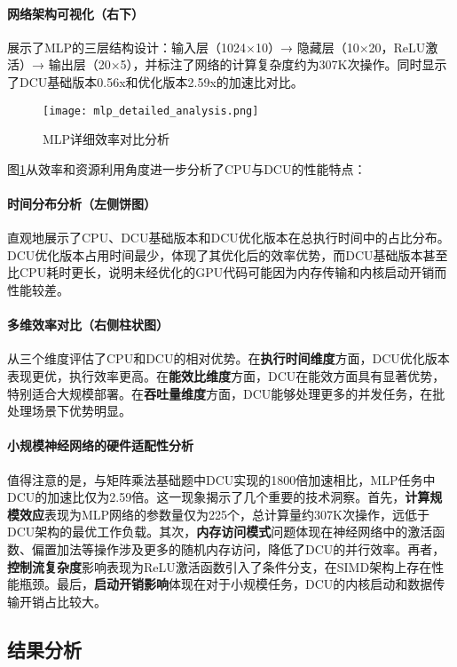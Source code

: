 \documentclass[a4paper]{article}
\begin{document}
\paragraph{网络架构可视化（右下）}展示了MLP的三层结构设计：输入层（1024×10）→ 隐藏层（10×20，ReLU激活）→ 输出层（20×5），并标注了网络的计算复杂度约为307K次操作。同时显示了DCU基础版本0.56x和优化版本2.59x的加速比对比。

\begin{figure}[H]
\centering
\texttt{[image: mlp\_detailed\_analysis.png]}
\caption{MLP详细效率对比分析}
\label{fig:mlp_detailed}
\end{figure}

图\ref{fig:mlp_detailed}从效率和资源利用角度进一步分析了CPU与DCU的性能特点：

\paragraph{时间分布分析（左侧饼图）}直观地展示了CPU、DCU基础版本和DCU优化版本在总执行时间中的占比分布。DCU优化版本占用时间最少，体现了其优化后的效率优势，而DCU基础版本甚至比CPU耗时更长，说明未经优化的GPU代码可能因为内存传输和内核启动开销而性能较差。

\paragraph{多维效率对比（右侧柱状图）}从三个维度评估了CPU和DCU的相对优势。在\textbf{执行时间维度}方面，DCU优化版本表现更优，执行效率更高。在\textbf{能效比维度}方面，DCU在能效方面具有显著优势，特别适合大规模部署。在\textbf{吞吐量维度}方面，DCU能够处理更多的并发任务，在批处理场景下优势明显。

\paragraph{小规模神经网络的硬件适配性分析}

值得注意的是，与矩阵乘法基础题中DCU实现的1800倍加速相比，MLP任务中DCU的加速比仅为2.59倍。这一现象揭示了几个重要的技术洞察。首先，\textbf{计算规模效应}表现为MLP网络的参数量仅为225个，总计算量约307K次操作，远低于DCU架构的最优工作负载。其次，\textbf{内存访问模式}问题体现在神经网络中的激活函数、偏置加法等操作涉及更多的随机内存访问，降低了DCU的并行效率。再者，\textbf{控制流复杂度}影响表现为ReLU激活函数引入了条件分支，在SIMD架构上存在性能瓶颈。最后，\textbf{启动开销影响}体现在对于小规模任务，DCU的内核启动和数据传输开销占比较大。

\subsection{结果分析}
\end{document}
